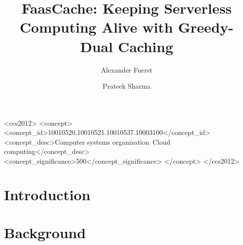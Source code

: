 \documentclass[sigconf,screen]{acmart}
\begin{document}

\title{FaasCache: Keeping Serverless Computing Alive with Greedy-Dual Caching}

\date{}

\author{Alexander Fuerst}
\author{Prateek Sharma}

\begin{CCSXML}
  <ccs2012>
  <concept>
  <concept_id>10010520.10010521.10010537.10003100</concept_id>
  <concept_desc>Computer systems organization~Cloud computing</concept_desc>
  <concept_significance>500</concept_significance>
  </concept>
  </ccs2012>
\end{CCSXML}
  



\begin{abstract}

\end{abstract}

\maketitle


\section{Introduction}
\vspace*{\subsecspace}
 



\section{Background}
\label{sec:bg}
\vspace*{\subsecspace}
 
\end{document}
